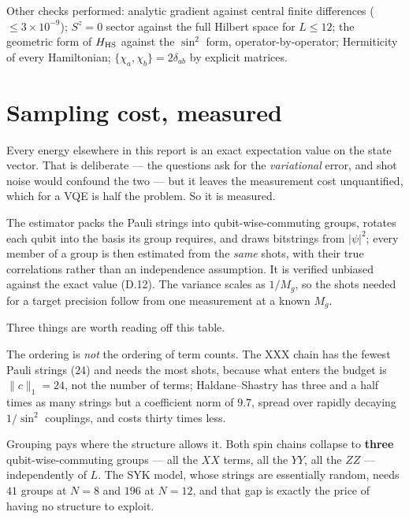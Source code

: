 \documentclass[10pt,a4paper]{article}
\begin{document}
\begin{center}\small

\end{center}

\noindent Other checks performed: analytic gradient against central finite
differences ($\le 3\times10^{-9}$); $S^z=0$ sector against the full Hilbert
space for $L\le12$; the geometric form of $H_{\rm HS}$ against the
$\sin^2$ form, operator-by-operator; Hermiticity of every Hamiltonian;
$\{\chi_a,\chi_b\}=2\delta_{ab}$ by explicit matrices.

\section{Sampling cost, measured}
\label{sec:shots}

Every energy elsewhere in this report is an exact expectation value on the
state vector. That is deliberate --- the questions ask for the \emph{variational}
error, and shot noise would confound the two --- but it leaves the measurement
cost unquantified, which for a VQE is half the problem. So it is measured.

The estimator packs the Pauli strings into qubit-wise-commuting groups, rotates
each qubit into the basis its group requires, and draws bitstrings from
$|\psi|^2$; every member of a group is then estimated from the \emph{same}
shots, with their true correlations rather than an independence assumption.
It is verified unbiased against the exact value (\textsf{D.12}). The variance
scales as $1/M_g$, so the shots needed for a target precision follow from one
measurement at a known $M_g$.

\begin{center}\small

\end{center}

Three things are worth reading off this table.

The ordering is \emph{not} the ordering of term counts. The XXX chain has the
fewest Pauli strings ($24$) and needs the most shots, because what enters the
budget is $\|c\|_1 = 24$, not the number of terms; Haldane--Shastry has three
and a half times as many strings but a coefficient norm of $9.7$, spread over
rapidly decaying $1/\sin^2$ couplings, and costs thirty times less.

Grouping pays where the structure allows it. Both spin chains collapse to
\textbf{three} qubit-wise-commuting groups --- all the $XX$ terms, all the $YY$,
all the $ZZ$ --- independently of $L$. The SYK model, whose strings are
essentially random, needs $41$ groups at $N=8$ and $196$ at $N=12$, and that
gap is exactly the price of having no structure to exploit.
\end{document}
